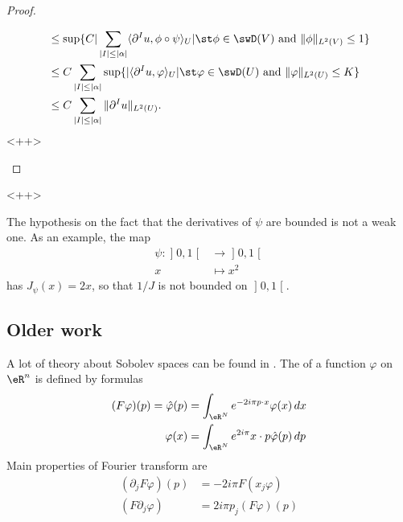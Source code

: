 \begin{proof}
\begin{subproof}
\begin{subequations}
\begin{align}
                    &\leq \sup\{ C|\sum_{| I |\leq | \alpha |}\langle \partial^Iu, \phi\circ\psi\rangle_U|\st \phi\in\swD(V)\text{ and }\| \phi \|_{L^2(V)}\leq 1 \}\\
                    &\leq C\sum_{| I |\leq | \alpha |} \sup\{ |\langle \partial^Iu, \varphi\rangle_U|\st \varphi\in\swD(U)\text{ and }\| \varphi \|_{L^2(U)}\leq K  \}\\
                    &\leq C\sum_{| I |\leq | \alpha |}\| \partial^Iu \|_{L^2(U)}.
                \end{align}
            \end{subequations}
            <++>
            

    \end{subproof}
    
\end{proof}
<++>

\begin{remark}
    The hypothesis on the fact that the derivatives of \( \psi\) are bounded is not a weak one. As an example, the map
    \begin{equation}
        \begin{aligned}
        \psi\colon \mathopen] 0 , 1 \mathclose[&\to \mathopen] 0 , 1 \mathclose[ \\
            x&\mapsto x^2 
        \end{aligned}
    \end{equation}
    has \( J_{\psi}(x)=2x\), so that \( 1/J\) is not bounded on \( \mathopen] 0 , 1 \mathclose[\).
\end{remark}

\subsection{Older work}\label{subsec_Sobolev}

A lot of theory about Sobolev spaces can be found in \cite{Maslov,Taylor_PDO}. The  of a function $\varphi$ on $\eR^n$ is defined by formulas
\begin{subequations}
\begin{align}
  (F\varphi)(p)=\hat\varphi(p)&=\int_{\eR^N} e^{-2i\pi p\cdot x}\varphi(x)\,dx\\
	\varphi(x)&=\int_{\eR^{N}} e^{2i\pi}x\cdot p\hat\varphi(p)\,dp
\end{align}
\end{subequations}
Main properties of Fourier transform are
\begin{subequations} \label{subeq_prop_Four}
\begin{align}
(\partial_jF\varphi)(p)&=-2i\pi F(x_j\varphi)\\
	(F\partial_j\varphi)&=2i\pi p_j(F\varphi)(p)
\end{align}
\end{subequations}

